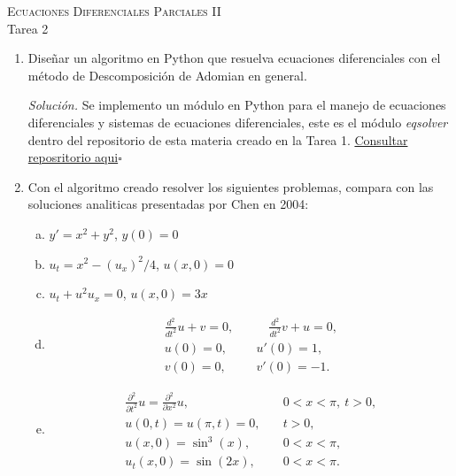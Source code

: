 \documentclass[12pt]{article}
\newcommand{\sol}{\textit{Solución. }}
\newcommand{\eej}{\hfill $\square$}
\begin{document}
    \pagestyle{empty}
    \begin{center}
        {\textsc{Ecuaciones Diferenciales Parciales II} \\
        \medskip 
        \large{Tarea 2}}
    \end{center}
    
    \bigskip
    
    \begin{enumerate}
        \item Diseñar un algoritmo en Python que resuelva ecuaciones
        diferenciales con el método de Descomposición de Adomian en general.

        \sol Se implemento un módulo en Python para el manejo de ecuaciones
        diferenciales y sistemas de ecuaciones diferenciales, este es el módulo
        \textit{eqsolver} dentro del repositorio de esta materia creado en la
        Tarea 1. \href{https://github.com/HazelS002/EDP-II/tree/main}
        {Consultar reposritorio aqui}\eej

        \item Con el algoritmo creado resolver los siguientes problemas, compara
        con las soluciones analiticas presentadas por Chen en 2004:
        \begin{enumerate}[(a)]
            \item $y'=x^2+y^2$, $y(0)=0$
            \item $u_t=x^2-(u_x)^2/4$, $u(x,0)=0$
            \item $u_t+u^2u_x=0$, $u(x,0)=3x$
            \item \begin{align*}
                \frac{d^2}{dt^2}u+v=0,&\qquad \frac{d^2}{dt^2}v+u=0,\\
                u(0)=0,&\quad u'(0)=1,\\
                v(0)=0,&\quad v'(0)=-1.
            \end{align*}
            \item \begin{align*}
                \frac{\partial^2}{\partial t^2}u=
                \frac{\partial^2}{\partial x^2}u,&\quad 0<x<\pi,~t>0,\\
                u(0,t)=u(\pi, t)=0,&\quad t>0,\\
                u(x,0)=\sin^3(x),&\quad 0<x<\pi,\\
                u_t(x,0) = \sin(2x),&\quad 0<x<\pi.
            \end{align*}
        \end{enumerate}


\end{enumerate}
\end{document}

